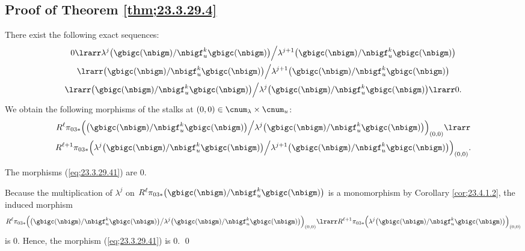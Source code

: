 \documentclass[a4,10pt]{article}
\begin{document}
\subsection{Proof of Theorem \ref{thm;23.3.29.4}}


There exist the following exact sequences:
\begin{multline}
  0\lrarr
 \lambda^j\bigl(\gbigc(\nbigm)/\nbigf_u^k\gbigc(\nbigm)\bigr)
  \Big/\lambda^{j+1}\bigl(\gbigc(\nbigm)/\nbigf_u^k\gbigc(\nbigm)\bigr)
  \\
\lrarr
  \bigl(\gbigc(\nbigm)/\nbigf_u^k\gbigc(\nbigm)\bigr)
  \Big/\lambda^{j+1}\bigl(\gbigc(\nbigm)/\nbigf_u^k\gbigc(\nbigm)\bigr)
  \\
\lrarr 
 \bigl(\gbigc(\nbigm)/\nbigf_u^k\gbigc(\nbigm)\bigr)
  \Big/\lambda^j\bigl(\gbigc(\nbigm)/\nbigf_u^k\gbigc(\nbigm)\bigr)
\lrarr 0.
\end{multline}
We obtain the following morphisms of the stalks at
$(0,0)\in\cnum_{\lambda}\times\cnum_u$:
\begin{multline}
\label{eq;23.3.29.41}
 R^{\ell}\pi_{03\ast}\Bigl(
  \bigl(\gbigc(\nbigm)/\nbigf_u^k\gbigc(\nbigm)\bigr)
  \Big/\lambda^j\bigl(\gbigc(\nbigm)/\nbigf_u^k\gbigc(\nbigm)\bigr)
 \Bigr)_{(0,0)}
 \lrarr \\
  R^{\ell+1}\pi_{03\ast}\Bigl(
  \lambda^j\bigl(\gbigc(\nbigm)/\nbigf_u^k\gbigc(\nbigm)\bigr)
  \Big/
   \lambda^{j+1}\bigl(\gbigc(\nbigm)/\nbigf_u^k\gbigc(\nbigm)\bigr)
  \Bigr)_{(0,0)}.
\end{multline}
\begin{lem}
\label{lem;23.4.1.3}
The morphisms {\rm(\ref{eq;23.3.29.41})} are $0$.
\end{lem}
\pf
Because
the multiplication of $\lambda^j$ on
$R^{\ell}\pi_{03\ast}\bigl(
\gbigc(\nbigm)/\nbigf_u^k\gbigc(\nbigm)
\bigr)$
is a monomorphism by Corollary \ref{cor;23.4.1.2},
the induced morphism 
\[
R^{\ell}\pi_{03\ast}\Bigl(
      \bigl(\gbigc(\nbigm)/\nbigf_u^k\gbigc(\nbigm)\bigr)
      \big/\lambda^{j}
      \bigl(\gbigc(\nbigm)/\nbigf_u^k\gbigc(\nbigm)\bigr)
      \Bigr)_{(0,0)}
      \lrarr
R^{\ell+1}\pi_{03\ast}\Bigl(
      \lambda^j\bigl(\gbigc(\nbigm)/\nbigf_u^k\gbigc(\nbigm)\bigr)
      \Bigr)_{(0,0)}
\]      
is $0$. Hence, the morphism (\ref{eq;23.3.29.41}) is $0$.
\hfill\qed
\end{document}
